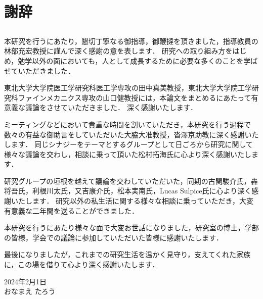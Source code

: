 \cleardoublepage %
\chapter*{謝辞}

\section*{}
本研究を行うにあたり，懇切丁寧なる御指導，御鞭撻を頂きました，指導教員の林部充宏教授に謹んで深く感謝の意を表します．
研究への取り組み方をはじめ，勉学以外の面においても，人として成長するために必要な多くのことを学ばせていただきました．

東北大学大学院医工学研究科医工学専攻の田中真美教授，東北大学大学院工学研究科ファインメカニクス専攻の山口健教授には，本論文をまとめるにあたって有意義な議論をさせていただきました．
深く感謝いたします．

ミーティングなどにおいて貴重な時間を割いていただき，本研究を行う過程で数々の有益な御助言をしていただいた大脇大准教授，沓澤京助教に深く感謝いたします．
同じシナジーをテーマとするグループとして日ごろから研究に関して様々な議論を交わし，相談に乗って頂いた松村拓海氏に心より深く感謝いたします．

研究グループの垣根を越えて議論を交わしていただいた，同期の古関駿介氏，轟将吾氏，利根川太氏，又吉康介氏，松本実南氏，Lucas Sulpice氏に心より深く感謝いたします．
研究以外の私生活に関する様々な相談に乗っていただき，大変有意義な二年間を送ることができました．

本研究を行うにあたり様々な面で大変お世話になりました，研究室の博士，学部の皆様，学会での議論に参加していただいた皆様に感謝いたします．

最後になりましたが，これまでの研究生活を温かく見守り，支えてくれた家族に，この場を借りて心より深く感謝いたします．

\begin{flushright}
2024年2月1日\\
おなまえ たろう
\end{flushright}
